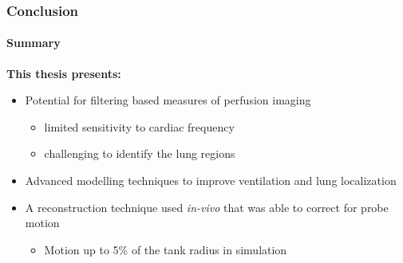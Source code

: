 \documentclass[10pt,    %
    english,            %
    xcolor=table,       %
    envcountsect,        %
    aspectratio=1610
]{beamer}
\begin{document}
\begin{frame}
\frametitle{Conclusion}
\framesubtitle{Summary}
\textbf{This thesis presents:}
\vspace{2mm}
\begin{itemize}
	\item Potential for filtering based measures of perfusion imaging
	\begin{itemize}
		\item limited sensitivity to cardiac frequency
		\item challenging to identify the lung regions
	\end{itemize}
	\vspace{2mm}
	\item Advanced modelling techniques to improve ventilation and lung localization

	\vspace{2mm}
	\item A reconstruction technique used \emph{in-vivo} that was able to correct for
	probe motion 
	\begin{itemize}
		\item Motion up to 5\% of the tank radius in simulation
	\end{itemize}
\end{itemize}
\end{frame}
\end{document}
